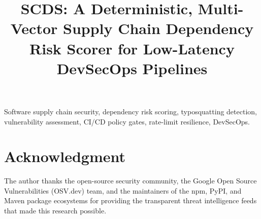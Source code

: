 \documentclass[10pt,conference]{IEEEtran}
\begin{document}
\title{SCDS: A Deterministic, Multi-Vector Supply Chain Dependency Risk Scorer for Low-Latency DevSecOps Pipelines}

\author{
}

\maketitle



\begin{IEEEkeywords}
Software supply chain security, dependency risk scoring, typosquatting detection, vulnerability assessment, CI/CD policy gates, rate-limit resilience, DevSecOps.
\end{IEEEkeywords}










\section*{Acknowledgment}
The author thanks the open-source security community, the Google Open Source Vulnerabilities (OSV.dev) team, and the maintainers of the npm, PyPI, and Maven package ecosystems for providing the transparent threat intelligence feeds that made this research possible.



\end{document}
